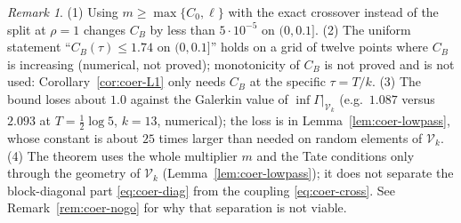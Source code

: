 \documentclass[11pt]{amsart}
\theoremstyle{definition}
\theoremstyle{remark}
\newtheorem{remark}[theorem]{Remark}
\begin{document}
\begin{remark}\label{rem:coer-B}
(1) Using $m\ge\max\{C_0,\ell\}$ with the exact crossover instead of the split at $\rho=1$ changes $C_B$ by less than
$5\cdot10^{-5}$ on $(0,0.1]$. (2) The uniform statement ``$C_B(\tau)\le1.74$ on $(0,0.1]$'' holds on a grid of
twelve points where $C_B$ is increasing (numerical, not proved); monotonicity of $C_B$ is not proved and is not used:
Corollary~\ref{cor:coer-L1} only needs $C_B$ at the specific $\tau=T/k$. (3) The bound loses about $1.0$ against
the Galerkin value of $\inf\Gamma|_{\mathcal V_k}$ (e.g.\ $1.087$ versus $2.093$ at $T=\frac12\log5$, $k=13$,
numerical); the loss is in Lemma~\ref{lem:coer-lowpass}, whose constant is about $25$ times larger than needed
on random elements of $\mathcal V_k$. (4) The theorem uses the whole multiplier $m$ and the Tate
conditions only through the geometry of $\mathcal V_k$ (Lemma~\ref{lem:coer-lowpass}); it does not separate the
block-diagonal part \eqref{eq:coer-diag} from the coupling \eqref{eq:coer-cross}. See Remark~\ref{rem:coer-nogo}
for why that separation is not viable.
\end{remark}
\end{document}
